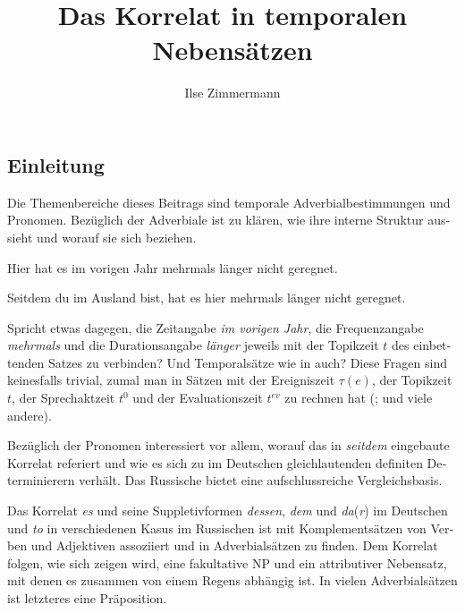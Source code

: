 \documentclass[output=paper, colorlinks, citecolor=brown, booklanguage=german]{langscibook}
\author{Ilse Zimmermann\affiliation{Zentrum für Allgemeine Sprachwissenschaft (ZAS), Berlin}}
\title{Das Korrelat in temporalen Nebensätzen}
\begin{document}
\begin{otherlanguage}{german}
\maketitle


\section{Einleitung} \label{sec:18:1}

Die Themenbereiche dieses Beitrags sind temporale Adverbialbestimmungen und Pronomen. Bezüglich der Adverbiale ist zu klären, wie ihre interne Struktur aus\-sieht und worauf sie sich beziehen.

\ea \label{ex:18:1} Hier hat es im vorigen Jahr mehrmals länger nicht geregnet.
\z

\ea \label{ex:18:2} Seitdem du im Ausland bist, hat es hier mehrmals länger nicht geregnet.
\z

\noindent Spricht etwas dagegen, die Zeitangabe \textit{im vorigen Jahr}, die Frequenzangabe \textit{mehr\-mals} und die Durationsangabe \textit{länger} jeweils mit der Topikzeit $t$ des einbettenden Satzes zu verbinden? Und Temporalsätze wie in  auch? Diese Fragen sind keinesfalls trivial, zumal man in Sätzen mit der Ereigniszeit $\tau(e)$, der Topikzeit $t$, der Sprechaktzeit $t^0$ und der Evaluationszeit $t^{ev}$ zu rechnen hat (\citealt{Reichenbach1947}; \citealt{Klein1994} und viele andere).

Bezüglich der Pronomen interessiert vor allem, worauf das in \textit{seitdem} eingebaute Korrelat referiert und wie es sich zu im Deutschen gleichlautenden definiten Determinierern verhält. Das Russische bietet eine aufschlussreiche Ver\-gleichs\-ba\-sis.

Das Korrelat \textit{es} und seine Suppletivformen \textit{dessen}, \textit{dem} und \textit{da}(\textit{r}) im Deutschen und \textit{to} in verschiedenen Kasus im Russischen ist mit Komplementsätzen von Verben und Adjektiven assoziiert \citep{Schwabe-Frey-etal2016,Schwabe2013,Sudhoff2016,Zimmermann1993,Zimmermann2015,Zimmermann2016} und in Adverbialsätzen zu finden. Dem Korrelat folgen, wie sich zeigen wird, eine fakultative NP und ein attributiver Nebensatz, mit denen es zusammen von einem Regens abhängig ist. In vielen Adverbialsätzen ist letzteres eine Präposition.


\end{otherlanguage}
\end{document}
